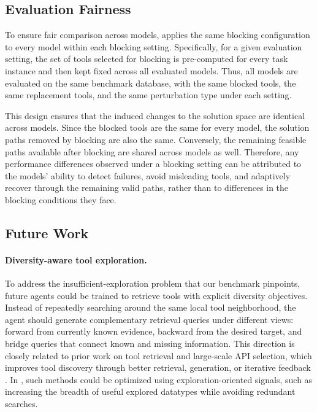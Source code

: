 \subsection{Evaluation Fairness}
\label{app:evaluation-fairness}

To ensure fair comparison across models, \bench{} applies the same blocking configuration to every model within each blocking setting. 
Specifically, for a given evaluation setting, the set of tools selected for blocking is pre-computed for every task instance and then kept fixed across all evaluated models. 
Thus, all models are evaluated on the same benchmark database, with the same blocked tools, the same replacement tools, and the same perturbation type under each setting.

This design ensures that the induced changes to the solution space are identical across models. 
Since the blocked tools are the same for every model, the solution paths removed by blocking are also the same. 
Conversely, the remaining feasible paths available after blocking are shared across models as well. 
Therefore, any performance differences observed under a blocking setting can be attributed to the models’ ability to detect failures, avoid misleading tools, and adaptively recover through the remaining valid paths, rather than to differences in the blocking conditions they face.

\subsection{Future Work}
\label{app:potential-improvement-methods}

\paragraph{Diversity-aware tool exploration.}
To address the insufficient-exploration problem that our benchmark pinpoints, future agents could be trained to retrieve tools with explicit diversity objectives. 
Instead of repeatedly searching around the same local tool neighborhood, the agent should generate complementary retrieval queries under different views: forward from currently known evidence, backward from the desired target, and bridge queries that connect known and missing information. 
This direction is closely related to prior work on tool retrieval and large-scale API selection, which improves tool discovery through better retrieval, generation, or iterative feedback \citep{APIBench,ToolRet,xu2024enhancing,ToolGen}. 
In \bench{}, such methods could be optimized using exploration-oriented signals, such as increasing the breadth of useful explored datatypes while avoiding redundant searches.

